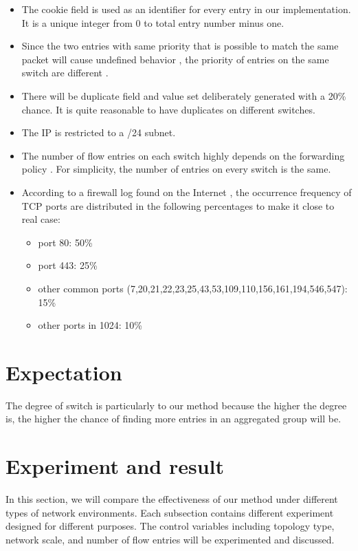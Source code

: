 \begin{itemize}
\item 
The cookie field is used as an identifier for every entry in our implementation. It is a unique integer from 0 to total entry number minus one.\sout{}
\item
Since the two entries with same priority that is possible to match the same packet will cause undefined behavior \cite{OF_SPEC}, the priority of entries on the same switch are different .
\item
There will be duplicate field and value set deliberately generated with a 20\% chance. It is quite reasonable to have duplicates on different switches. 
\item
The IP is restricted to a /24 subnet.
\item
The number of flow entries on each switch highly depends on the forwarding policy \cite{MPFHMRSV09}. For simplicity, the number of entries on every switch is the same. 
\item
According to a firewall log found on the Internet \cite{PORT_FREQ}, the occurrence frequency of TCP ports are distributed in the following percentages to make it close to real case:
\begin{itemize}
\item
port 80: 50\%
\item
port 443: 25\%
\item
other common ports (7,20,21,22,23,25,43,53,109,110,156,161,194,546,547): 15\%
\item
other ports in 1024: 10\%
\end{itemize}
\end{itemize}

\section{Expectation}

The degree of switch is particularly to our method because the higher the degree is, the higher the chance of finding more entries in an aggregated group will be.


\section{Experiment and result}
In this section, we will compare the effectiveness of our method under different types of network environments. Each subsection contains different experiment designed for different purposes. The control variables including topology type, network scale, and number of flow entries will be experimented and discussed. 

